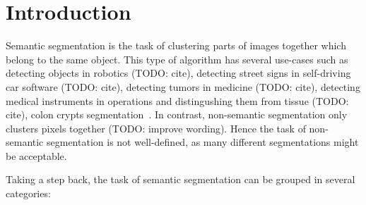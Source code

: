 \section{Introduction}\label{sec:introduction}
Semantic segmentation is the task of clustering parts of images together which
belong to the same object. This type of algorithm has several use-cases such as
detecting objects in robotics (TODO: cite), detecting street signs in
self-driving car software (TODO: cite), detecting tumors in medicine (TODO:
cite), detecting medical instruments in operations and distingushing them from
tissue (TODO: cite), colon crypts segmentation~\cite{cohen2015memory}. In
contrast, non-semantic segmentation only clusters pixels together (TODO:
improve wording). Hence the task of non-semantic segmentation is not
well-defined, as many different segmentations might be acceptable.




Taking a step back, the task of semantic segmentation can be grouped in several
categories:

